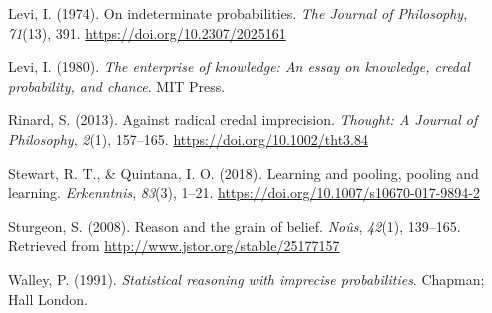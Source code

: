 \documentclass[
  10pt,
  dvipsnames,enabledeprecatedfontcommands]{scrartcl}
\newlength{\cslhangindent}
\newlength{\cslentryspacingunit} %
\newenvironment{CSLReferences}[2] %
 {%
  \setlength{\parindent}{0pt}
  \ifodd #1
  \let\oldpar\par
  \def\par{\hangindent=\cslhangindent\oldpar}
  \fi
  \setlength{\parskip}{#2\cslentryspacingunit}
 }%
 {}
\begin{document}
\begin{CSLReferences}{1}{0}
\leavevmode{}%
Levi, I. (1974). On indeterminate probabilities. \emph{The Journal of
Philosophy}, \emph{71}(13), 391. \url{https://doi.org/10.2307/2025161}

\leavevmode{}%
Levi, I. (1980). \emph{The enterprise of knowledge: An essay on
knowledge, credal probability, and chance}. MIT Press.

\leavevmode{}%
Rinard, S. (2013). Against radical credal imprecision. \emph{Thought: A
Journal of Philosophy}, \emph{2}(1), 157--165.
\url{https://doi.org/10.1002/tht3.84}

\leavevmode{}%
Stewart, R. T., \& Quintana, I. O. (2018). Learning and pooling, pooling
and learning. \emph{Erkenntnis}, \emph{83}(3), 1--21.
\url{https://doi.org/10.1007/s10670-017-9894-2}

\leavevmode{}%
Sturgeon, S. (2008). Reason and the grain of belief. \emph{No{û}s},
\emph{42}(1), 139--165. Retrieved from
\url{http://www.jstor.org/stable/25177157}

\leavevmode{}%
Walley, P. (1991). \emph{Statistical reasoning with imprecise
probabilities}. Chapman; Hall London.

\end{CSLReferences}
\end{document}
